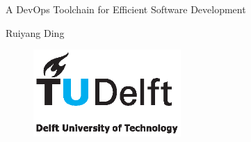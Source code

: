 \begin{titlepage}

\null\vfill

\begin{center}
\LARGE{A DevOps Toolchain for Efficient Software Development}
\end{center}

\vspace{1.5cm}

\begin{center}
Ruiyang Ding
\end{center}

\vfill

\begin{figure}[!b]
\centering
\includegraphics[width={0.5\textwidth}]{pics/TUD_logo_color.eps}
\end{figure}

\vspace{2.0cm}

\end{titlepage}

